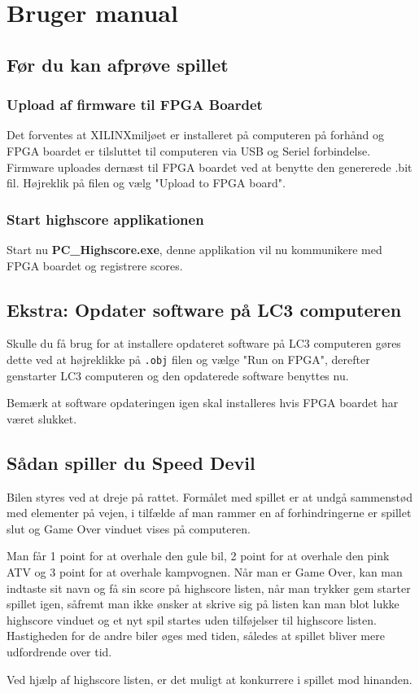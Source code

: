 \section{Bruger manual}
\subsection*{Før du kan afprøve spillet}
\subsubsection*{Upload af firmware til FPGA Boardet}
Det forventes at XILINX\textregistered miljøet er installeret på computeren på forhånd og FPGA boardet er tilsluttet til computeren via USB og Seriel forbindelse.
Firmware uploades dernæst til FPGA boardet ved at benytte den genererede .bit fil. Højreklik på filen og vælg "Upload to FPGA board".

\subsubsection*{Start highscore applikationen}
Start nu \textbf{PC\_Highscore.exe}, denne applikation vil nu kommunikere med FPGA boardet og registrere scores.

\subsection*{Ekstra: Opdater software på LC3 computeren}
Skulle du få brug for at installere opdateret software på LC3 computeren gøres dette ved at højreklikke på \texttt{.obj} filen og vælge "Run on FPGA", derefter genstarter LC3 computeren og den opdaterede software benyttes nu.

Bemærk at software opdateringen igen skal installeres hvis FPGA boardet har været slukket.


\subsection*{Sådan spiller du \textbf{Speed Devil}}
Bilen styres ved at dreje på rattet. Formålet med spillet er at undgå sammenstød med elementer på vejen, i tilfælde af man rammer en af forhindringerne er spillet slut og Game Over vinduet vises på computeren.

Man får 1 point for at overhale den gule bil, 2 point for at overhale den pink ATV og 3 point for at overhale kampvognen. Når man er Game Over, kan man indtaste sit navn og få sin score på highscore listen, når man trykker gem starter spillet igen, såfremt man ikke ønsker at skrive sig på listen kan man blot lukke highscore vinduet og et nyt spil startes uden tilføjelser til highscore listen.
Hastigheden for de andre biler øges med tiden, således at spillet bliver mere udfordrende over tid.

Ved hjælp af highscore listen, er det muligt at konkurrere i spillet mod hinanden.